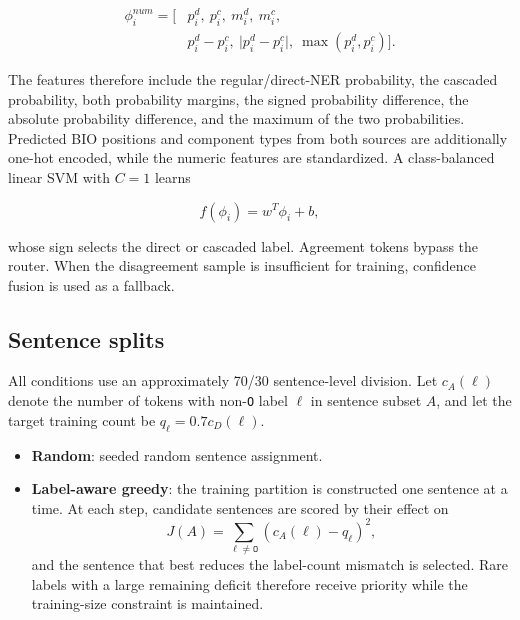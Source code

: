\documentclass[conference,a4paper]{IEEEtran}
\begin{document}
\begin{equation}
\begin{aligned}
\phi_i^{num}=\big[&p_i^d,\ p_i^c,\ m_i^d,\ m_i^c,\\
&p_i^d-p_i^c,\ \lvert p_i^d-p_i^c\rvert,\
\max(p_i^d,p_i^c)\big].
\end{aligned}
\end{equation}

The features therefore include the regular/direct-NER probability, the cascaded probability, both probability margins, the signed probability difference, the absolute probability difference, and the maximum of the two probabilities. Predicted BIO positions and component types from both sources are additionally one-hot encoded, while the numeric features are standardized. A class-balanced linear SVM with $C=1$ learns

\begin{equation}
f(\phi_i)=w^T\phi_i+b,
\end{equation}

whose sign selects the direct or cascaded label. Agreement tokens bypass the router. When the disagreement sample is insufficient for training, confidence fusion is used as a fallback.

\subsection{Sentence splits}

All conditions use an approximately 70/30 sentence-level division. Let $c_A(\ell)$ denote the number of tokens with non-\texttt{O} label $\ell$ in sentence subset $A$, and let the target training count be $q_\ell=0.7c_D(\ell)$.

\begin{itemize}
  \item \textbf{Random}: seeded random sentence assignment.
  \item \textbf{Label-aware greedy}: the training partition is constructed one sentence at a time. At each step, candidate sentences are scored by their effect on
  \begin{equation}
  J(A)=\sum_{\ell\ne\texttt{O}}
  \left(c_A(\ell)-q_\ell\right)^2,
  \end{equation}
  and the sentence that best reduces the label-count mismatch is selected. Rare labels with a large remaining deficit therefore receive priority while the training-size constraint is maintained.
\end{itemize}
\end{document}
